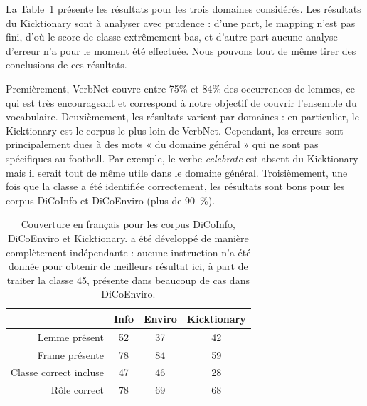 La Table~\ref{table:coverage} présente les résultats pour les trois domaines
considérés. Les résultats du Kicktionary sont à analyser avec prudence : d'une
part, le mapping n'est pas fini, d'où le score de classe extrêmement bas, et
d'autre part aucune analyse d'erreur n'a pour le moment été effectuée. Nous
pouvons tout de même tirer des conclusions de ces résultats.

Premièrement, VerbNet couvre entre 75\% et 84\% des occurrences de lemmes, ce
qui est très encourageant et correspond à notre objectif de couvrir l'ensemble
du vocabulaire.
Deuxièmement, les résultats varient par domaines : en particulier, le
Kicktionary est le corpus le plus loin de VerbNet. Cependant, les erreurs sont
principalement dues à des mots « du domaine général » qui ne sont pas
spécifiques au football. Par exemple, le verbe \textit{celebrate} est absent du
Kicktionary mais il serait tout de même utile dans le domaine général.
Troisièmement, une fois que la classe a été identifiée correctement, les
résultats sont bons pour les corpus DiCoInfo et DiCoEnviro (plus de 90~\%).

\begin{table}[h]
\centering
\begin{tabular}{rccc}
  \toprule
         & Info & Enviro & Kicktionary \\
  \midrule
  Lemme présent          & 52 & 37 & 42 \\
  Frame présente         & 78 & 84 & 59 \\
  Classe correct incluse & 47 & 46 & 28 \\
  Rôle correct           & 78 & 69 & 68 \\
  \bottomrule
\end{tabular}

\caption{\label{table:coverage} Couverture \verbenet{} en français pour les
corpus DiCoInfo, DiCoEnviro et Kicktionary. \verbenet{} a été développé de
manière complètement indépendante : aucune instruction n'a été donnée pour
obtenir de meilleurs résultat ici, à part de traiter la classe 45, présente
dans beaucoup de cas dans DiCoEnviro.}
\end{table}

